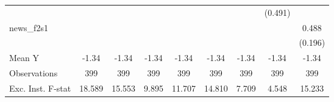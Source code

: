 {\begin{tabular}{l*{8}{c}}
            &                     &                     &                     &                     &                     &                     &     (0.491)         &                     \\
\addlinespace
news\_f2s1   &                     &                     &                     &                     &                     &                     &                     &       0.488\sym{**} \\
            &                     &                     &                     &                     &                     &                     &                     &     (0.196)         \\
\midrule
Mean Y      &       -1.34         &       -1.34         &       -1.34         &       -1.34         &       -1.34         &       -1.34         &       -1.34         &       -1.34         \\
Observations&         399         &         399         &         399         &         399         &         399         &         399         &         399         &         399         \\
Exc. Inst. F-stat&      18.589         &      15.553         &       9.895         &      11.707         &      14.810         &       7.709         &       4.548         &      15.233         \\
\bottomrule
\end{tabular}
}
